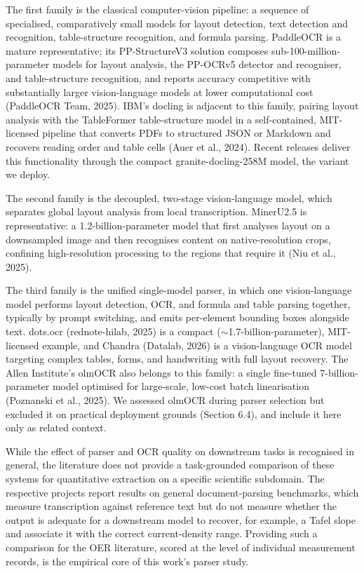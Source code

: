 \documentclass{template}
\begin{document}
The first family is the classical computer-vision pipeline: a sequence of specialised, comparatively small models for layout detection, text detection and recognition, table-structure recognition, and formula parsing. PaddleOCR is a mature representative; its PP-StructureV3 solution composes sub-100-million-parameter models for layout analysis, the PP-OCRv5 detector and recogniser, and table-structure recognition, and reports accuracy competitive with substantially larger vision-language models at lower computational cost (PaddleOCR Team, 2025). IBM's docling is adjacent to this family, pairing layout analysis with the TableFormer table-structure model in a self-contained, MIT-licensed pipeline that converts PDFs to structured JSON or Markdown and recovers reading order and table cells (Auer et al., 2024). Recent releases deliver this functionality through the compact granite-docling-258M model, the variant we deploy.

The second family is the decoupled, two-stage vision-language model, which separates global layout analysis from local transcription. MinerU2.5 is representative: a 1.2-billion-parameter model that first analyses layout on a downsampled image and then recognises content on native-resolution crops, confining high-resolution processing to the regions that require it (Niu et al., 2025).

The third family is the unified single-model parser, in which one vision-language model performs layout detection, OCR, and formula and table parsing together, typically by prompt switching, and emits per-element bounding boxes alongside text. dots.ocr (rednote-hilab, 2025) is a compact ($\sim$1.7-billion-parameter), MIT-licensed example, and Chandra (Datalab, 2026) is a vision-language OCR model targeting complex tables, forms, and handwriting with full layout recovery. The Allen Institute's olmOCR also belongs to this family: a single fine-tuned 7-billion-parameter model optimised for large-scale, low-cost batch linearisation (Poznanski et al., 2025). We assessed olmOCR during parser selection but excluded it on practical deployment grounds (Section 6.4), and include it here only as related context.

While the effect of parser and OCR quality on downstream tasks is recognised in general, the literature does not provide a task-grounded comparison of these systems for quantitative extraction on a specific scientific subdomain. The respective projects report results on general document-parsing benchmarks, which measure transcription against reference text but do not measure whether the output is adequate for a downstream model to recover, for example, a Tafel slope and associate it with the correct current-density range. Providing such a comparison for the OER literature, scored at the level of individual measurement records, is the empirical core of this work's parser study.
\end{document}
